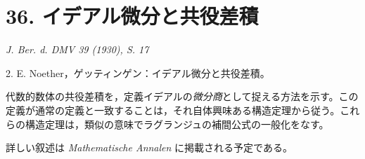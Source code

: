 \documentclass[11pt]{article}
\begin{document}
\section*{36. イデアル微分と共役差積}

\begin{center}
\emph{J. Ber. d. DMV 39 (1930), S. 17}
\end{center}

2. E. Noether，ゲッティンゲン：イデアル微分と共役差積。

代数的数体の共役差積を，定義イデアルの\emph{微分商}として捉える方法を示す。この定義が通常の定義と一致することは，それ自体興味ある構造定理から従う。これらの構造定理は，類似の意味でラグランジュの補間公式の一般化をなす。

詳しい叙述は \emph{Mathematische Annalen} に掲載される予定である。
\end{document}
